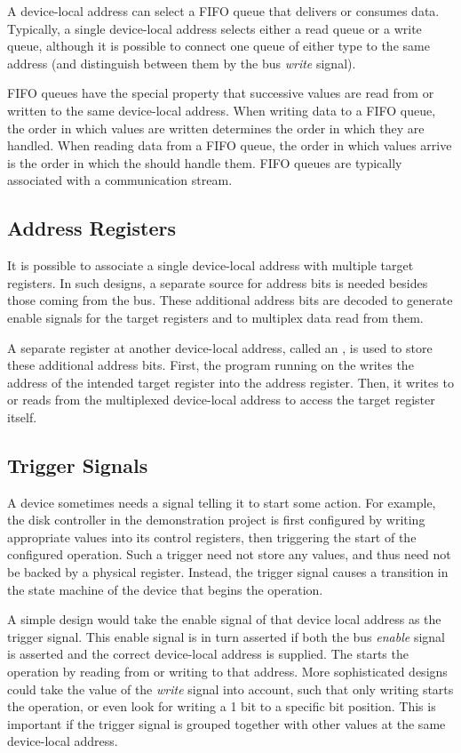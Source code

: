 A device-local address can select a FIFO queue that delivers or consumes data. Typically, a single device-local address selects either a read queue or a write queue, although it is possible to connect one queue of either type to the same address (and distinguish between them by the bus {\it write} signal).

FIFO queues have the special property that successive values are read from or written to the same device-local address. When writing data to a FIFO queue, the order in which values are written determines the order in which they are handled. When reading data from a FIFO queue, the order in which values arrive is the order in which the \eco should handle them. FIFO queues are typically associated with a communication stream.

\subsection{Address Registers}

It is possible to associate a single device-local address with multiple target registers. In such designs, a separate source for address bits is needed besides those coming from the bus. These additional address bits are decoded to generate enable signals for the target registers and to multiplex data read from them.

A separate register at another device-local address, called an , is used to store these additional address bits. First, the program running on the \eco writes the address of the intended target register into the address register. Then, it writes to or reads from the multiplexed device-local address to access the target register itself.

\subsection{Trigger Signals}

A device sometimes needs a signal telling it to start some action. For example, the disk controller in the demonstration project is first configured by writing appropriate values into its control registers, then triggering the start of the configured operation. Such a trigger need not store any values, and thus need not be backed by a physical register. Instead, the trigger signal causes a transition in the state machine of the device that begins the operation.

A simple design would take the enable signal of that device local address as the trigger signal. This enable signal is in turn asserted if both the bus {\it enable} signal is asserted and the correct device-local address is supplied. The \eco starts the operation by reading from or writing to that address. More sophisticated designs could take the value of the {\it write} signal into account, such that only writing starts the operation, or even look for writing a 1 bit to a specific bit position. This is important if the trigger signal is grouped together with other values at the same device-local address.

